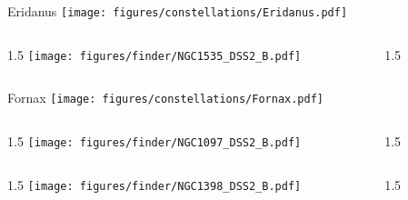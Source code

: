 \documentclass[final]{beamer}
\newlength{\colwidth}
\begin{document}

\begin{frame}[t]{\LARGE Eridanus}
    \centering
    \texttt{[image: figures/constellations/Eridanus.pdf]}
\end{frame}


\begin{frame}[t]{}
    \begin{columns}[T]
        \begin{column}{1.5\colwidth}
            \centering
            \texttt{[image: figures/finder/NGC1535\_DSS2\_B.pdf]}
        \end{column}
        \begin{column}{1.5\colwidth}
            \Large
            
        \end{column}
    \end{columns}
    \vspace{\fill}
\end{frame}


\begin{frame}[t]{\LARGE Fornax}
    \centering
    \texttt{[image: figures/constellations/Fornax.pdf]}
\end{frame}


\begin{frame}[t]{}
    \begin{columns}[T]
        \begin{column}{1.5\colwidth}
            \centering
            \texttt{[image: figures/finder/NGC1097\_DSS2\_B.pdf]}
        \end{column}
        \begin{column}{1.5\colwidth}
            \Large
            
        \end{column}
    \end{columns}
    \vspace{\fill}
    \begin{columns}[T]
        \begin{column}{1.5\colwidth}
            \centering
            \texttt{[image: figures/finder/NGC1398\_DSS2\_B.pdf]}
        \end{column}
        \begin{column}{1.5\colwidth}
            \Large
            
        \end{column}
    \end{columns}
\end{frame}
\end{document}
